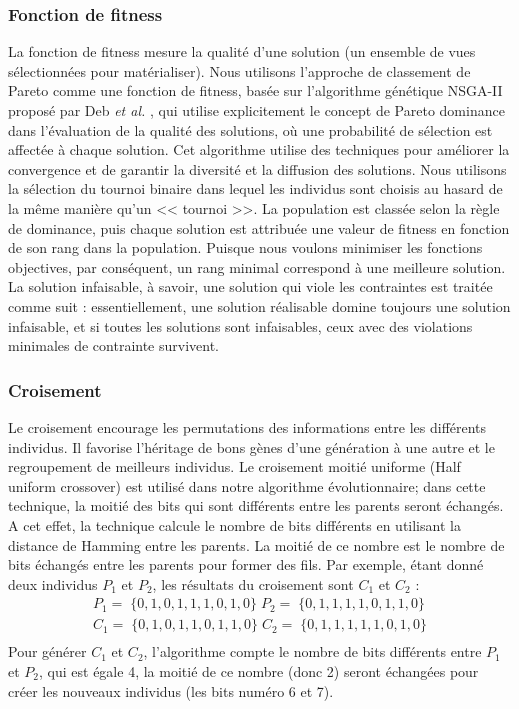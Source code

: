 \subsubsection{Fonction de fitness}\label{subsubsec:FitnessFunction}
La fonction de fitness mesure la qualité d'une solution (un ensemble de vues sélectionnées pour matérialiser). Nous utilisons l'approche de classement de Pareto comme une fonction de fitness, basée sur l'algorithme génétique NSGA-II proposé par Deb \textit {et al.} \cite{Deb02}, qui utilise explicitement le concept de Pareto dominance dans l'évaluation de la qualité des solutions, où une probabilité de sélection est affectée à chaque solution. Cet algorithme utilise des techniques pour améliorer la convergence et de garantir la diversité et la diffusion des solutions.
Nous utilisons la sélection du tournoi binaire dans lequel les individus sont choisis au hasard de la même manière qu'un << tournoi >>.
La population est classée selon la règle de dominance, puis chaque solution est attribuée une valeur de fitness en fonction de son rang dans la population. Puisque nous voulons minimiser les fonctions objectives, par conséquent, un rang minimal correspond à une meilleure solution.
La solution infaisable, à savoir, une solution qui viole les contraintes est traitée comme suit : essentiellement, une solution réalisable domine toujours une solution infaisable, et si toutes les solutions sont infaisables, ceux avec des violations minimales de contrainte survivent.

\subsubsection{Croisement}\label{subsubsec:Crossover}
Le croisement encourage les permutations des informations entre les différents individus. Il favorise l'héritage de bons gènes d'une génération à une autre et le regroupement de meilleurs individus.
Le croisement moitié uniforme (Half uniform crossover) est utilisé dans notre algorithme évolutionnaire; dans cette technique, la moitié des bits qui sont différents entre les parents seront échangés. A cet effet, la technique calcule le nombre de bits différents en utilisant la distance de Hamming entre les parents. La moitié de ce nombre est le nombre de bits échangés entre les parents pour former des fils. Par exemple, étant donné deux individus $P_1$ et $P_2$, les résultats du croisement sont $C_1$ et $C_2$ :
\begin{equation*}
\begin{array}{l}
  P_1 = \; \{0,1,0,1,1,1,0,1,0\} \; P_2 = \; \{0,1,1,1,1,0,1,1,0\} \\
  C_1 = \; \{0,1,0,1,1,0,1,1,0\} \; C_2 = \; \{0,1,1,1,1,1,0,1,0\} \\
\end{array}
\end{equation*}
Pour générer $C_1$ et $C_2$, l'algorithme compte le nombre de bits différents entre $P_1$ et $P_2$, qui est égale 4, la moitié de ce nombre (donc 2) seront échangées pour créer les nouveaux individus (les bits numéro 6 et 7).

